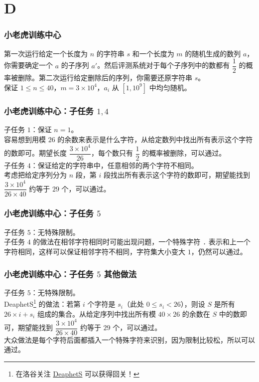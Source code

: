 \documentclass{beamer}
\begin{document}
\section{D}

\begin{frame}
\frametitle{小老虎训练中心}
第一次运行给定一个长度为 $n$ 的字符串 $s$ 和一个长度为 $m$ 的随机生成的数列 $a$，你需要确定一个 $a$ 的子序列 $a'$。然后评测系统对于每个子序列中的数都有 $\dfrac 12$ 的概率被删除。第二次运行给定删除后的序列，你需要还原字符串 $s$。\\
保证 $1 \leq n \leq 40$，$m = 3 \times 10^4$，$a_i$ 从 $[1, 10^9]$ 中均匀随机。
\end{frame}

\begin{frame}
\frametitle{小老虎训练中心：子任务 $1, 4$}
子任务 $1$：保证 $n = 1$。\\
\pause
容易想到用模 $26$ 的余数来表示是什么字符，从给定数列中找出所有表示这个字符的数即可。期望长度 $\dfrac{3 \times 10^4}{26}$，每个数只有 $\dfrac 12$ 的概率被删除，可以通过。\\
\pause
子任务 $4$：保证给定的字符串中，任意相邻的两个字符不相同。\\
\pause
考虑把给定序列分为 $n$ 段，第 $i$ 段找出所有表示这个字符的数即可，期望能找到 $\dfrac{3 \times 10^4}{26 \times 40}$ 约等于 $29$ 个，可以通过。
\end{frame}

\begin{frame}
\frametitle{小老虎训练中心：子任务 $5$}
子任务 $5$：无特殊限制。\\
\pause
子任务 $4$ 的做法在相邻字符相同时可能出现问题，一个特殊字符 \texttt{.} 表示和上一个字符相同，这样可以保证相邻字符不相同，字符集大小变大 $1$，仍然可以通过。
\end{frame}

\begin{frame}
\frametitle{小老虎训练中心：子任务 $5$ 其他做法}
子任务 $5$：无特殊限制。\\
DeaphetS\footnote{在洛谷关注 \href{https://www.luogu.com.cn/user/4672}{DeaphetS} 可以获得回关！} 的做法：若第 $i$ 个字符是 $s_i$（此处 $0 \leq s_i < 26$），则设 $S$ 是所有 $26 \times i + s_i$ 组成的集合。从给定序列中找出所有模 $40 \times 26$ 的余数在 $S$ 中的数即可，期望能找到 $\dfrac{3 \times 10^4}{26 \times 40}$ 约等于 $29$ 个，可以通过。\\
\pause
大众做法是每个字符后面都插入一个特殊字符来识别，因为限制比较松，所以可以通过。
\end{frame}
\end{document}
